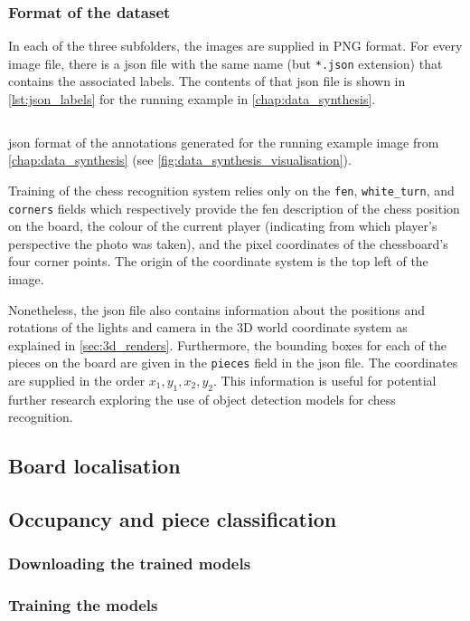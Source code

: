 \documentclass[../../report.tex]{subfiles}
\begin{document}
\subsubsection{Format of the dataset}
In each of the three subfolders, the images are supplied in PNG format.
For every image file, there is a \gls{json} file with the same name (but \texttt{*.json} extension) that contains the associated labels.
The contents of that \gls{json} file is shown in \cref{lst:json_labels} for the running example in \cref{chap:data_synthesis}.
\begin{listing}
    \inputminted{json}{\subfix{../../data/3828.json}}
    \caption{\acs{json} format of the annotations generated for the running example image from \cref{chap:data_synthesis} (see \cref{fig:data_synthesis_visualisation}).}
    \label{fig:json_labels}
\end{listing}
Training of the chess recognition system relies only on the \texttt{fen}, \texttt{white\_turn}, and \texttt{corners} fields which respectively provide the \gls{fen} description of the chess position on the board, the colour of the current player (indicating from which player's perspective the photo was taken), and the pixel coordinates of the chessboard's four corner points.
The origin of the coordinate system is the top left of the image.

Nonetheless, the \gls{json} file also contains information about the positions and rotations of the lights and camera in the 3D world coordinate system as explained in \cref{sec:3d_renders}.
Furthermore, the bounding boxes for each of the pieces on the board are given in the \texttt{pieces} field in the \gls{json} file.
The coordinates are supplied in the order $x_1,y_1,x_2,y_2$.
This information is useful for potential further research exploring the use of object detection models for chess recognition.

\subsection{Board localisation}

\subsection{Occupancy and piece classification}
\subsubsection{Downloading the trained models}
\subsubsection{Training the models}
\end{document}
